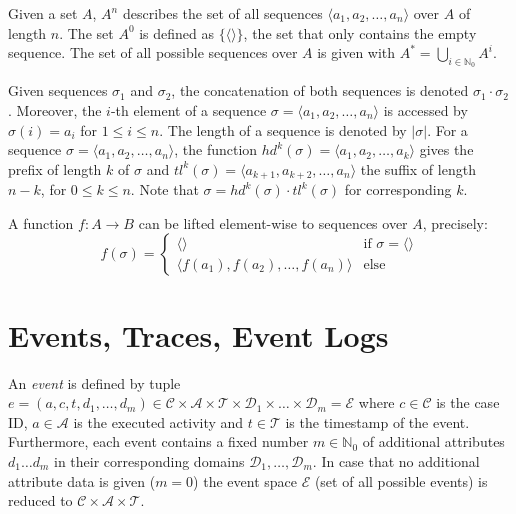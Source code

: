 Given a set $A$, $A^n$ describes the set of all sequences $\langle a_1, a_2, \dots, a_n\rangle$ over $A$ of length $n$.
The set $A^0$ is defined as $\{\langle \rangle\}$, the set that only contains the empty sequence.
The set of all possible sequences over $A$ is given with $A^* = \bigcup\limits_{i\in \mathbb{N}_0} A^i$.

Given sequences $\sigma_1$ and $\sigma_2$, the concatenation of both sequences is denoted $\sigma_1 \cdot \sigma_2$.
Moreover, the $i$-th element of a sequence $\sigma = \langle a_1, a_2, \dots, a_n\rangle$ is accessed by $\sigma(i)= a_i$ for $1 \leq i \leq n$.
The length of a sequence is denoted by $|\sigma|$.
For a sequence $\sigma=\langle a_1, a_2, \dots, a_n\rangle$, the function
$hd^k(\sigma)= \langle a_1, a_2, \dots, a_k\rangle$ gives the prefix of length $k$ of $\sigma$ and $tl^k(\sigma)= \langle a_{k+1}, a_{k+2}, \dots, a_n\rangle$ the suffix of length $n-k$, for $0 \leq k \leq n$.
Note that $\sigma = hd^k(\sigma) \cdot tl^k(\sigma)$ for corresponding $k$.

A function $f \colon A \to B$ can be lifted element-wise to sequences over $A$, precisely:
\[
f(\sigma) =
\begin{cases}
\langle \rangle & \text{if $\sigma = \langle \rangle$} \\
\langle f(a_1), f(a_2), \dots, f(a_n)\rangle & \text{else} 
\end{cases}
\]



\section{Events, Traces, Event Logs}

\begin{definition}[Event]
An  \textit{event} is defined by tuple $e = (a,c,t,d_1,\dots, d_m) \in \mathcal{C} \times \mathcal{A}  \times \mathcal{T} \times \mathcal{D}_1 \times \dots \times \mathcal{D}_m =  \mathcal{E}$ where  $c \in \mathcal{C} $ is the case ID, $a \in \mathcal{A}$ is the executed activity and $t \in \mathcal{T}$ is the timestamp of the event.
Furthermore, each event contains a fixed number $m \in \mathbb{N}_0$ of additional attributes $d_1 \dots d_m$ in their corresponding domains $\mathcal{D}_1, \dots , \mathcal{D}_m$.
In case that no additional attribute data is given ($m = 0$) the event space $\mathcal{E}$ (set of all possible events) is reduced to $\mathcal{C} \times \mathcal{A}  \times \mathcal{T}$.
\end{definition}

